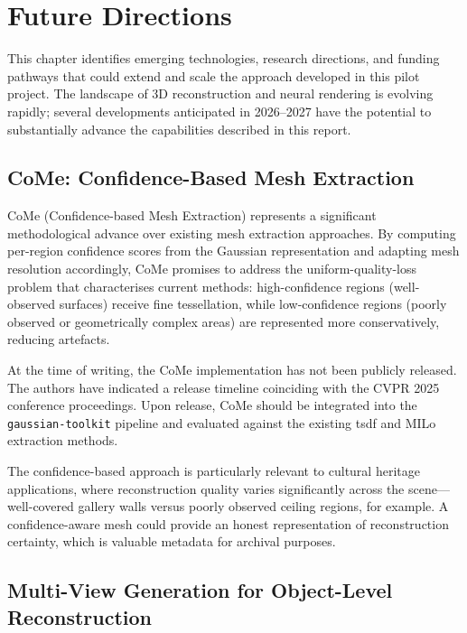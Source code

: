 \chapter{Future Directions}
\label{ch:future}

This chapter identifies emerging technologies, research directions, and funding pathways that could extend and scale the approach developed in this pilot project. The landscape of 3D reconstruction and neural rendering is evolving rapidly; several developments anticipated in 2026--2027 have the potential to substantially advance the capabilities described in this report.

\section{CoMe: Confidence-Based Mesh Extraction}
\label{sec:fut-come}

CoMe (Confidence-based Mesh Extraction) \parencite{Radl2025CoMe} represents a significant methodological advance over existing mesh extraction approaches. By computing per-region confidence scores from the Gaussian representation and adapting mesh resolution accordingly, CoMe promises to address the uniform-quality-loss problem that characterises current methods: high-confidence regions (well-observed surfaces) receive fine tessellation, while low-confidence regions (poorly observed or geometrically complex areas) are represented more conservatively, reducing artefacts.

At the time of writing, the CoMe implementation has not been publicly released. The authors have indicated a release timeline coinciding with the CVPR 2025 conference proceedings. Upon release, CoMe should be integrated into the \texttt{gaussian-toolkit} pipeline and evaluated against the existing \acrshort{tsdf} and MILo extraction methods.

The confidence-based approach is particularly relevant to cultural heritage applications, where reconstruction quality varies significantly across the scene---well-covered gallery walls versus poorly observed ceiling regions, for example. A confidence-aware mesh could provide an honest representation of reconstruction certainty, which is valuable metadata for archival purposes.

\section{Multi-View Generation for Object-Level Reconstruction}
\label{sec:fut-hunyuan}

